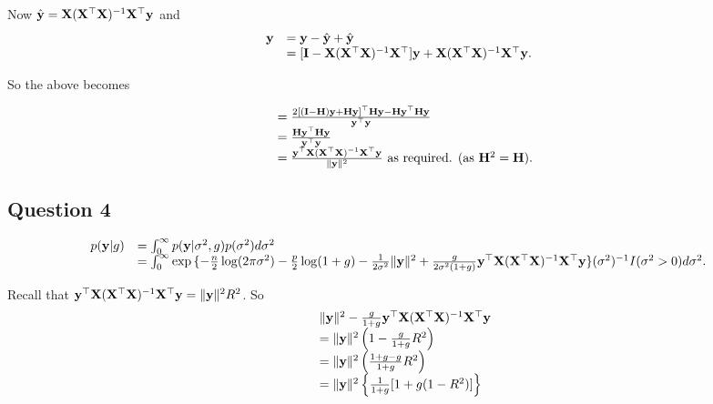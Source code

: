\documentclass{amsart}[12pt]
\theoremstyle{definition}
\begin{document}
Now $\hat{{\bf y}} = {\bf X} ({\bf X}^\top {\bf X})^{-1} {\bf X}^\top {\bf y}$ and
\begin{equation*}
	\begin{array}{ll}
		{\bf y} & = {\bf y} - \hat{{\bf y}} + \hat{{\bf y}}                                                          \\
		    & = [{\bf I} - {\bf X} ({\bf X}^\top {\bf X})^{-1} {\bf X}^\top] {\bf y} + {\bf X} ({\bf X}^\top {\bf X})^{-1} {\bf X}^\top {\bf y}. 
	\end{array}
\end{equation*}

So the above becomes

\begin{equation*}
	\begin{array}{ll}
		  & = \frac{2[({\bf I} - {\bf H}) {\bf y} + {\bf H} {\bf y}]^\top {\bf H} {\bf y} - {\bf H} {\bf y}^\top {\bf H} {\bf y}}{{\bf y}^\top {\bf y}}                             \\
		  & = \frac{{\bf H} {\bf y}^\top {\bf H} {\bf y}}{{\bf y}^\top {\bf y}}                                                                         \\
		  & = \frac{{\bf y}^\top {\bf X} ({\bf X}^\top {\bf X})^{-1} {\bf X}^\top {\bf y}}{\| {\bf y} \|^2} \text{ as required. } (\text{as } {\bf H}^2 = {\bf H}). 
	\end{array}
\end{equation*}

\subsection{Question 4}
\begin{equation*}
	\begin{array}{ll}
		p({\bf y} | g) & = \int_0^\infty p({\bf y} | \sigma^2, g) p(\sigma^2) d \sigma^2                          \\
		           & = \int_0^\infty \exp{\{ -\frac{n}{2} \log (2 \pi \sigma^2) - \frac{p}{2} \log(1 + g) 
		- \frac{1}{2 \sigma^2} \| {\bf y}\|^2
		+ \frac{g}{2 \sigma^2 (1 + g)} {\bf y}^\top {\bf X}({\bf X}^\top {\bf X})^{-1} {\bf X}^\top {\bf y}\}}
		(\sigma^2)^{-1} I(\sigma^2 > 0) d \sigma^2.
	\end{array}
\end{equation*}

Recall that ${\bf y}^\top {\bf X}({\bf X}^\top {\bf X})^{-1} {\bf X}^\top {\bf y} = \| {\bf y} \|^2 R^2$. So
\begin{equation*}
	\begin{array}{ll}
		  & \| {\bf y} \|^2 -\frac{g}{1 + g} {\bf y}^\top {\bf X} ({\bf X}^\top {\bf X})^{-1} {\bf X}^\top {\bf y} \\
		  & = \| {\bf y} \|^2 \left(1 - \frac{g}{1 + g}R^2 \right)                         \\
		  & = \| {\bf y} \|^2 \left(\frac{1 + g - g}{1 + g} R^2 \right)                    \\
		  & = \| {\bf y} \|^2 \left\{ \frac{1}{1 + g} [ 1 + g(1 - R^2) ] \right\}          
	\end{array}
\end{equation*}
\end{document}
